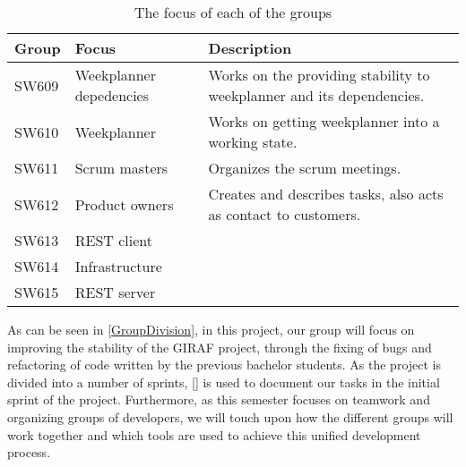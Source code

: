 \begin{table}[H]
\centering
\begin{tabular}{|p{2cm}|p{3cm}|p{8cm}|}
\hline
Group & Focus & Description \\ \hline
SW609 & Weekplanner depedencies & Works on the providing stability to
weekplanner and its dependencies.\\\hline 
SW610 & Weekplanner & Works on getting weekplanner into a working
state.\\
\hline SW611 & Scrum masters & Organizes the scrum meetings. \\\hline 
SW612 & Product owners & Creates and describes tasks, also acts as contact to
customers. \\\hline 
SW613 & REST client & \\ \hline

SW614 & Infrastructure & \\ \hline

SW615 & REST server & \\ \hline

\end{tabular}
\caption{The focus of each of the groups}
\label{GroupDivision}
\end{table}



As can be seen in \autoref{GroupDivision}, in this project, our group will focus
on improving the stability of the GIRAF project, through the fixing of bugs and
refactoring of code written by the previous bachelor students. As the project is
divided into a number of sprints, \autoref{} is used to document our tasks in
the initial sprint of the project. Furthermore, as this semester focuses on
teamwork and organizing groups of developers, we will touch upon how the
different groups will work together and which tools are used to achieve this
unified development process.

